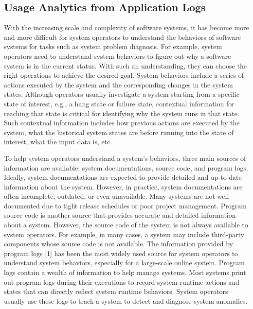 \documentclass{llncs}
\begin{document}
\subsection{Usage Analytics from Application Logs}
With the increasing scale and complexity of software
systems, it has become more and more difficult for system operators to understand the behaviors of software systems for tasks such as system problem diagnosis. For example, system operators need to understand system behaviors to figure out why a software system is in the current status. With such an understanding, they can choose the right operations to achieve the desired goal. System behaviors include a series of actions executed by the system and the corresponding changes in the system states. Although operators usually investigate a system starting from a specific state of interest, e.g., a hang state or failure state, contextual information for reaching that state is critical for identifying why the system runs in that state. Such contextual information includes how previous actions are executed by the system, what the historical system states are before running into the state of interest, what the input data is, etc.

To help system operators understand a system’s behaviors,
three main sources of information are available: system documentations, source code, and program logs. Ideally, system documentations are expected to provide detailed and up-to-date information about the system. However, in practice, system documentations are often incomplete, outdated, or even unavailable. Many systems are not well documented due to tight release schedules or poor project management. Program source code is another source that provides accurate and detailed information about a system. However, the source code of the system is not always available to system operators. For example, in many cases, a system may include third-party components whose source code is not available. The information provided by program logs [1] has been the
most widely used source for system operators to understand system behaviors, especially for a large-scale online system. Program logs contain a wealth of information to help manage systems. Most systems print out program logs during their executions to record system runtime actions and states that can directly reflect system runtime behaviors. System operators usually use these logs to track a system to detect and diagnose system anomalies.
\end{document}
